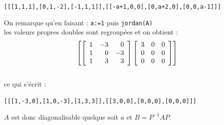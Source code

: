 \documentclass{article}
\begin{document}
\begin{enumerate}
\begin{center}
{\tt [[[1,1,1],[0,1,-2],[-1,1,1]],[[-a+1,0,0],[0,a+2,0],[0,0,a-1]]]}
\end{center}
On remarque qu'en faisant : {\tt a:=1} puis {\tt jordan(A)} \\
les valeurs propres doubles sont regroup\'ees et on obtient :
$$ {\tt \left[ \left[ 
\begin{array}{rrr}
1 & -3 & 0\\
1 & 0 & -3\\
1 & 3 & 3
\end{array}
\right] 
\left[\begin{array}{ccc}
3 & 0 & 0\\
0 & 0 & 0\\
0 & 0 & 0
\end{array}
\right] 
\right]}$$\\
ce qui s'\'ecrit :
\begin{center}
{\tt [[[1,-3,0],[1,0,-3],[1,3,3]],[[3,0,0],[0,0,0],[0,0,0]]]}
\end{center}
$A$ est donc diagonalisable quelque soit $a$ et $B=P^{-1}AP$.
\end{enumerate}

\pagebreak
\end{document}
